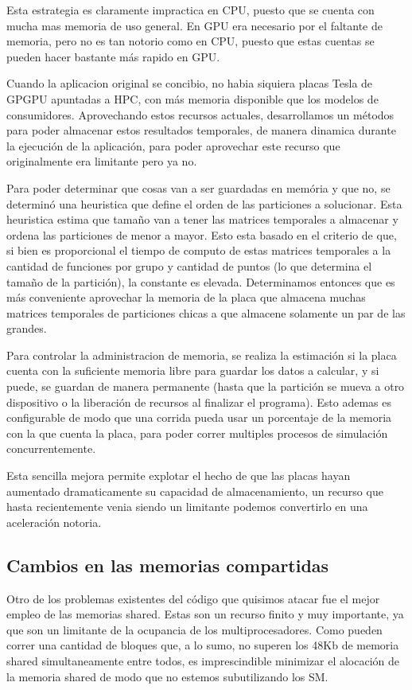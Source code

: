 Esta estrategia es claramente impractica en CPU, puesto que se cuenta con mucha mas memoria
de uso general. En GPU era necesario por el faltante de memoria, pero no es tan notorio como en CPU,
puesto que estas cuentas se pueden hacer bastante m\'as rapido en GPU.

Cuando la aplicacion original se concibio, no habia siquiera placas Tesla de GPGPU apuntadas a HPC, con
m\'as memoria disponible que los modelos de consumidores. Aprovechando estos recursos actuales,
desarrollamos un m\'etodos para poder almacenar estos resultados temporales, de manera dinamica
durante la ejecuci\'on de la aplicaci\'on, para poder aprovechar este recurso que originalmente
era limitante pero ya no.

Para poder determinar que cosas van a ser guardadas en mem\'oria y que no, se determin\'o una heuristica
que define el orden de las particiones a solucionar. Esta heuristica estima que tama\~no van a
tener las matrices temporales a almacenar y ordena las particiones de menor a mayor. Esto
esta basado en el criterio de que, si bien es proporcional el tiempo de computo de estas matrices
temporales a la cantidad de funciones por grupo y cantidad de puntos (lo que determina el tama\~no
de la partici\'on), la constante es elevada. Determinamos entonces que es m\'as conveniente
aprovechar la memoria de la placa que almacena muchas matrices temporales de particiones chicas
a que almacene solamente un par de las grandes.

Para controlar la administracion de memoria, se realiza la estimaci\'on si la placa cuenta
con la suficiente memoria libre para guardar los datos a calcular, y si puede, se guardan de manera
permanente (hasta que la partici\'on se mueva a otro dispositivo o la liberaci\'on de recursos al
finalizar el programa). Esto ademas es configurable de modo que una corrida pueda usar un porcentaje
de la memoria con la que cuenta la placa, para poder correr multiples procesos de simulaci\'on concurrentemente.

Esta sencilla mejora permite explotar el hecho de que las placas hayan aumentado dramaticamente su
capacidad de almacenamiento, un recurso que hasta recientemente venia siendo un limitante podemos
convertirlo en una aceleraci\'on notoria.


\subsection{Cambios en las memorias compartidas}
Otro de los problemas existentes del c\'odigo que quisimos atacar fue el mejor empleo de las
memorias shared. Estas son un recurso finito y muy importante, ya que son un limitante de
la ocupancia de los multiprocesadores. Como pueden correr una cantidad de bloques que, a lo sumo,
no superen los 48Kb de memoria shared simultaneamente entre todos, es imprescindible minimizar el
alocaci\'on de la memoria shared de modo que no estemos subutilizando los SM.

